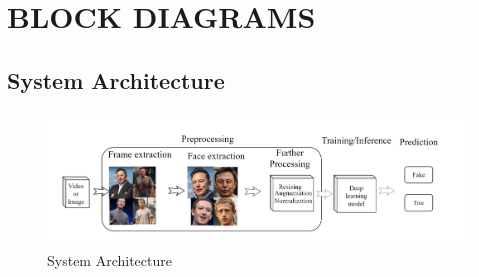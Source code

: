 \section{BLOCK DIAGRAMS}
\subsection{System Architecture}
\begin{figure}[h]
    \centering
    \includegraphics[width= 6.5in ]{img/systemachitecture.drawio.png}
    \caption{System Architecture}
\end{figure}
